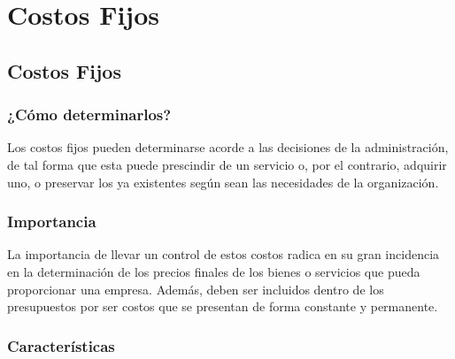 \documentclass[../main]{subfiles}
\begin{document}
\chapter{Costos Fijos}
\section{Costos Fijos}
\subsection{¿Cómo determinarlos?}
Los costos fijos pueden determinarse acorde a las decisiones de la
administración, de tal forma que esta puede prescindir de un servicio
o, por el contrario, adquirir uno, o preservar los ya existentes según
sean las necesidades de la organización.
\subsection{Importancia}
La importancia de llevar un control de estos costos radica en su gran
incidencia en la determinación de los precios finales de los bienes o
servicios que pueda proporcionar una empresa. Además, deben ser
incluidos dentro de los presupuestos por ser costos que se presentan
de forma constante y permanente.

\subsection{Características}
\end{document}
